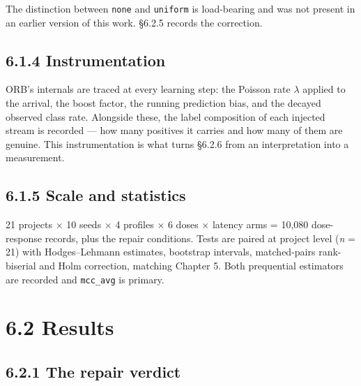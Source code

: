 The distinction between \texttt{none} and \texttt{uniform} is
load-bearing and was not present in an earlier version of this work.
\S{}6.2.5 records the correction.

\subsection{6.1.4 Instrumentation}\label{instrumentation}

ORB's internals are traced at every learning step: the Poisson rate \ensuremath{\lambda}
applied to the arrival, the boost factor, the running prediction bias,
and the decayed observed class rate. Alongside these, the label
composition of each injected stream is recorded --- how many positives
it carries and how many of them are genuine. This instrumentation is
what turns \S{}6.2.6 from an interpretation into a measurement.

\subsection{6.1.5 Scale and statistics}\label{scale-and-statistics}

21 projects \ensuremath{\times} 10 seeds \ensuremath{\times} 4 profiles \ensuremath{\times} 6 doses \ensuremath{\times} latency arms = 10,080
dose-response records, plus the repair conditions. Tests are paired at
project level (\emph{n} = 21) with Hodges--Lehmann estimates, bootstrap
intervals, matched-pairs rank-biserial and Holm correction, matching
Chapter 5. Both prequential estimators are recorded and
\texttt{mcc\_avg} is primary.

\section{6.2 Results}\label{results}

\subsection{6.2.1 The repair verdict}\label{the-repair-verdict}

